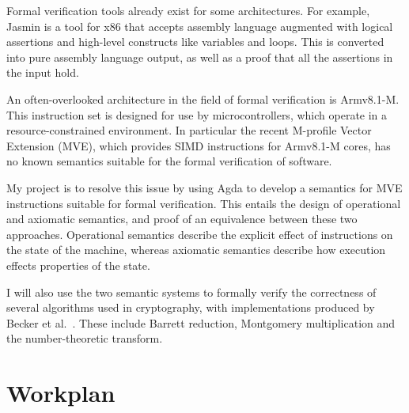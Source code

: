 \documentclass[11pt]{article}
\begin{document}
Formal verification tools already exist for some architectures. For example,
Jasmin is a tool for x86 that accepts assembly language augmented with logical
assertions and high-level constructs like variables and loops. This is
converted into pure assembly language output, as well as a proof that all the
assertions in the input hold.

An often-overlooked architecture in the field of formal verification is
Armv8.1-M. This instruction set is designed for use by microcontrollers, which
operate in a resource-constrained environment. In particular the recent
M-profile Vector Extension (MVE), which provides SIMD instructions for
Armv8.1-M cores, has no known semantics suitable for the formal verification
of software.

My project is to resolve this issue by using Agda to develop a semantics for
MVE instructions suitable for formal verification. This entails the design of
operational and axiomatic semantics, and proof of an equivalence between these
two approaches. Operational semantics describe the explicit effect of
instructions on the state of the machine, whereas axiomatic semantics describe
how execution effects properties of the state.

I will also use the two semantic systems to formally verify the correctness of
several algorithms used in cryptography, with implementations produced by
Becker et al.\ \cite{cryptoeprint_2021_998}. These include Barrett reduction,
Montgomery multiplication and the number-theoretic transform.

\section{Workplan}
\label{sec:org4e6f10a}
\end{document}
